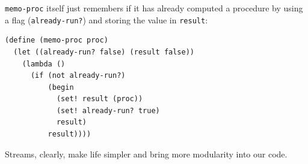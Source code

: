 \documentclass[9pt]{report}
\begin{document}
\texttt{memo-proc} itself just remembers if it has already computed a
procedure by using a flag (\texttt{already-run?}) and storing the value
in \texttt{result}:

\begin{verbatim}
(define (memo-proc proc)
  (let ((already-run? false) (result false))
    (lambda ()
      (if (not already-run?)
          (begin
            (set! result (proc))
            (set! already-run? true)
            result)
          result))))
\end{verbatim}

Streams, clearly, make life simpler and bring more modularity into
our code.
\end{document}
